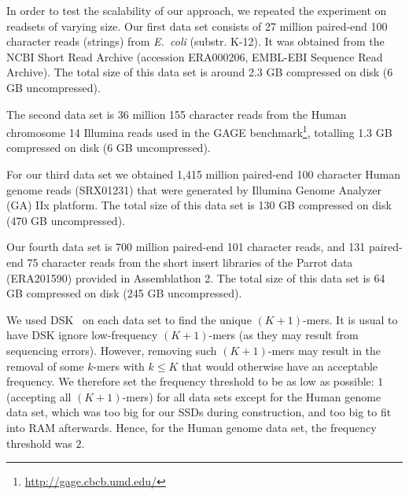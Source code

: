 In order to test the scalability of our approach, we repeated the experiment on readsets of varying size.
Our first data set consists of 27 million paired-end 100 character reads (strings)
from {\em E.~coli} (substr.  K-12). It was obtained from the NCBI Short Read Archive (accession 
ERA000206, EMBL-EBI Sequence Read Archive). The total size of this data set is around 2.3 GB compressed on disk (6 GB uncompressed).

The second data set is 36 million 155 character reads from the Human chromosome 14 Illumina reads used in the GAGE
benchmark\footnote{\url{http://gage.cbcb.umd.edu/}}, totalling 1.3 GB compressed on disk (6 GB uncompressed).

For our third data set we obtained 1,415 million  paired-end 100 character Human genome reads
(SRX01231) that were generated by Illumina Genome Analyzer (GA) IIx platform. The total size of this data set is 130 GB compressed on disk (470 GB uncompressed).

Our fourth data set is 700 million paired-end 101 character reads, and 131 paired-end 75 character reads from the short
insert libraries of the Parrot data (ERA201590) provided in Assemblathon 2\cite{assemblathon2}.
The total size of this data set is 64 GB compressed on disk (245 GB uncompressed).


We used DSK~\cite{dsk} on each data set to find the unique $(K+1)$-mers.
It is usual to have DSK ignore low-frequency $(K+1)$-mers (as they may result from sequencing errors). 
However, removing such $(K+1)$-mers may result in the removal of some $k$-mers with $k \leq K$ that would 
otherwise have an acceptable frequency. We therefore set the frequency threshold to be as low as possible: $1$ (accepting 
all $(K+1)$-mers) for all data sets except for the Human genome data set, which was too big for our SSDs during construction,
and too big to fit into RAM afterwards. Hence, for the Human genome data set, the frequency threshold was $2$.


